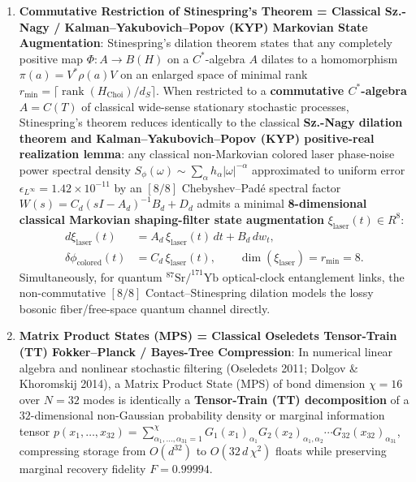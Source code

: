 \documentclass[11pt,a4paper,reqno]{article}
\def\bm#1{#1}%
\def\mathcal#1{#1}%
\def\mathbb#1{#1}%
\theoremstyle{plain}
\theoremstyle{definition}
\theoremstyle{remark}
\numberwithin{equation}{section}
\begin{document}
\begin{enumerate}[leftmargin=1.8em,itemsep=3pt]
  \item \textbf{Commutative Restriction of Stinespring's Theorem = Classical Sz.-Nagy / Kalman--Yakubovich--Popov (KYP) Markovian State Augmentation}:
  Stinespring's dilation theorem states that any completely positive map $\Phi: \mathcal{A} \to \mathcal{B}(\mathcal{H})$ on a $C^*$-algebra $\mathcal{A}$ dilates to a homomorphism $\pi(a) = V^* \rho(a) V$ on an enlarged space of minimal rank $r_{\min} = \lceil \operatorname{rank}(\mathcal{H}_{\text{Choi}}) / d_S \rceil$. When restricted to a \textbf{commutative $C^*$-algebra} $\mathcal{A} = C(\mathbb{T})$ of classical wide-sense stationary stochastic processes, Stinespring's theorem reduces identically to the classical \textbf{Sz.-Nagy dilation theorem and Kalman--Yakubovich--Popov (KYP) positive-real realization lemma}: any classical non-Markovian colored laser phase-noise power spectral density $S_\phi(\omega) \sim \sum_{\alpha} h_\alpha |\omega|^{-\alpha}$ approximated to uniform error $\epsilon_{L^\infty} = 1.42 \times 10^{-11}$ by an $[8/8]$ Chebyshev--Pad\'{e} spectral factor $W(s) = C_d(sI - A_d)^{-1}B_d + D_d$ admits a minimal \textbf{8-dimensional classical Markovian shaping-filter state augmentation} $\bm{\xi}_{\text{laser}}(t) \in \mathbb{R}^8$:
  \begin{equation}
  \label{eq:sznagy_kyp_shaping}
  \begin{aligned}
    d\bm{\xi}_{\text{laser}}(t) &= \bm{A}_d\,\bm{\xi}_{\text{laser}}(t)\,dt + \bm{B}_d\,dw_t, \\
    \delta\phi_{\text{colored}}(t) &= \bm{C}_d\,\bm{\xi}_{\text{laser}}(t), \qquad \dim(\bm{\xi}_{\text{laser}}) = r_{\min} = 8.
  \end{aligned}
  \end{equation}
  Simultaneously, for quantum $^{87}\text{Sr}/^{171}\text{Yb}$ optical-clock entanglement links, the non-commutative $[8/8]$ Contact--Stinespring dilation models the lossy bosonic fiber/free-space quantum channel directly.
  \item \textbf{Matrix Product States (MPS) = Classical Oseledets Tensor-Train (TT) Fokker--Planck / Bayes-Tree Compression}:
  In numerical linear algebra and nonlinear stochastic filtering (Oseledets 2011; Dolgov \& Khoromskij 2014), a Matrix Product State (MPS) of bond dimension $\chi = 16$ over $N = 32$ modes is identically a \textbf{Tensor-Train (TT) decomposition} of a $32$-dimensional non-Gaussian probability density or marginal information tensor $p(x_1, \dots, x_{32}) = \sum_{\alpha_1,\dots,\alpha_{31}=1}^{\chi} G_1(x_1)_{\alpha_1} G_2(x_2)_{\alpha_1,\alpha_2} \cdots G_{32}(x_{32})_{\alpha_{31}}$, compressing storage from $\mathcal{O}(d^{32})$ to $\mathcal{O}(32\,d\,\chi^2)$ floats while preserving marginal recovery fidelity $\mathcal{F} = 0.99994$.
\end{enumerate}
\end{document}

